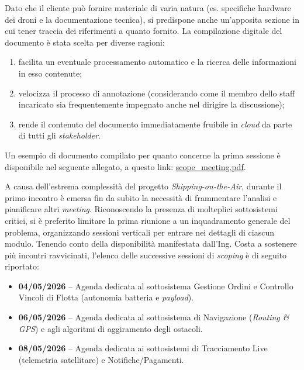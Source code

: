 \documentclass[12pt, a4paper]{article}
\begin{document}
Dato che il cliente può fornire materiale di varia natura (es. specifiche hardware dei droni e la documentazione tecnica), si predispone anche un'apposita sezione in cui tener traccia dei riferimenti a quanto fornito. La compilazione digitale del documento è stata scelta per diverse ragioni:
\begin{enumerate}
    \item facilita un eventuale processamento automatico e la ricerca delle informazioni in esso contenute;
    \item velocizza il processo di annotazione (considerando come il membro dello staff incaricato sia frequentemente impegnato anche nel dirigire la discussione);
    \item rende il contenuto del documento immediatamente fruibile in \textit{cloud} da parte di tutti gli \textit{stakeholder}.
\end{enumerate}

Un esempio di documento compilato per quanto concerne la prima sessione è disponibile nel seguente allegato, a questo link: \href{https://raw.githubusercontent.com/schwein69/Project-Management/master/docs/ScopeMeeting/Session1/scope_meeting.pdf}{scope\_meeting.pdf}.


A causa dell'estrema complessità del progetto \textit{Shipping-on-the-Air}, durante il primo incontro è emersa fin da subito la necessità di frammentare l'analisi e pianificare altri \textit{meeting}. Riconoscendo la presenza di molteplici sottosistemi critici, si è preferito limitare la prima riunione a un inquadramento generale del problema, organizzando sessioni verticali per entrare nei dettagli di ciascun modulo. Tenendo conto della disponibilità manifestata dall'Ing. Costa a sostenere più incontri ravvicinati, l'elenco delle successive sessioni di \textit{scoping} è di seguito riportato:
\begin{itemize}
    \item \textbf{04/05/2026} -- Agenda dedicata al sottosistema Gestione Ordini e Controllo Vincoli di Flotta (autonomia batteria e \textit{payload}).
    \item \textbf{06/05/2026} -- Agenda dedicata al sottosistema di Navigazione (\textit{Routing \& GPS}) e agli algoritmi di aggiramento degli ostacoli.
    \item \textbf{08/05/2026} -- Agenda dedicata ai sottosistemi di Tracciamento Live (telemetria satellitare) e Notifiche/Pagamenti.
\end{itemize}
\end{document}
